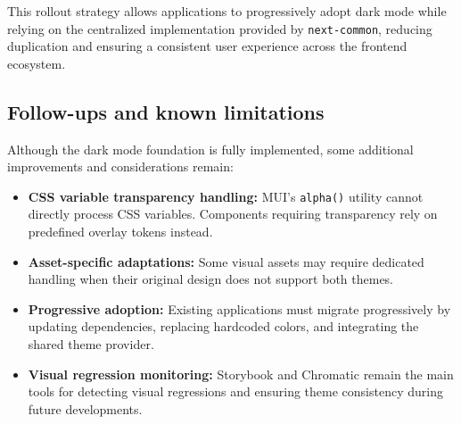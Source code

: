 This rollout strategy allows applications to progressively adopt dark mode while relying on the centralized implementation provided by \texttt{next-common}, reducing duplication and ensuring a consistent user experience across the frontend ecosystem.


\subsection{Follow-ups and known limitations}

Although the dark mode foundation is fully implemented, some additional improvements and considerations remain:

\begin{itemize}
    \item \textbf{CSS variable transparency handling:} MUI's \lstinline|alpha()| utility cannot directly process CSS variables. Components requiring transparency rely on predefined overlay tokens instead.

    \item \textbf{Asset-specific adaptations:} Some visual assets may require dedicated handling when their original design does not support both themes.

    \item \textbf{Progressive adoption:} Existing applications must migrate progressively by updating dependencies, replacing hardcoded colors, and integrating the shared theme provider.

    \item \textbf{Visual regression monitoring:} Storybook and Chromatic remain the main tools for detecting visual regressions and ensuring theme consistency during future developments.
\end{itemize}

\clearpage